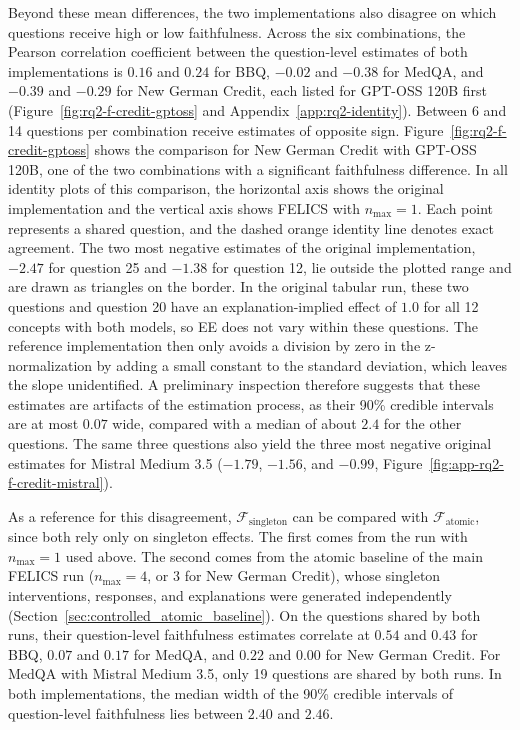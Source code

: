 Beyond these mean differences, the two implementations also disagree on which questions receive high or low faithfulness. Across the six combinations, the Pearson correlation coefficient between the question-level estimates of both implementations is $0.16$ and $0.24$ for BBQ, $-0.02$ and $-0.38$ for MedQA, and $-0.39$ and $-0.29$ for New German Credit, each listed for GPT-OSS 120B first (Figure~\ref{fig:rq2-f-credit-gptoss} and Appendix~\ref{app:rq2-identity}). Between 6 and 14 questions per combination receive estimates of opposite sign. Figure~\ref{fig:rq2-f-credit-gptoss} shows the comparison for New German Credit with GPT-OSS 120B, one of the two combinations with a significant faithfulness difference. In all identity plots of this comparison, the horizontal axis shows the original implementation and the vertical axis shows FELICS with $n_{\max}=1$. Each point represents a shared question, and the dashed orange identity line denotes exact agreement. The two most negative estimates of the original implementation, $-2.47$ for question 25 and $-1.38$ for question 12, lie outside the plotted range and are drawn as triangles on the border. In the original tabular run, these two questions and question 20 have an explanation-implied effect of $1.0$ for all 12 concepts with both models, so EE does not vary within these questions. The reference implementation then only avoids a division by zero in the z-normalization by adding a small constant to the standard deviation, which leaves the slope unidentified. A preliminary inspection therefore suggests that these estimates are artifacts of the estimation process, as their 90\% credible intervals are at most $0.07$ wide, compared with a median of about $2.4$ for the other questions. The same three questions also yield the three most negative original estimates for Mistral Medium 3.5 ($-1.79$, $-1.56$, and $-0.99$, Figure~\ref{fig:app-rq2-f-credit-mistral}).

As a reference for this disagreement, $\mathcal{F}_{\mathrm{singleton}}$ can be compared with $\mathcal{F}_{\mathrm{atomic}}$, since both rely only on singleton effects. The first comes from the run with $n_{\max}=1$ used above. The second comes from the atomic baseline of the main FELICS run ($n_{\max}=4$, or $3$ for New German Credit), whose singleton interventions, responses, and explanations were generated independently (Section~\ref{sec:controlled_atomic_baseline}). On the questions shared by both runs, their question-level faithfulness estimates correlate at $0.54$ and $0.43$ for BBQ, $0.07$ and $0.17$ for MedQA, and $0.22$ and $0.00$ for New German Credit. For MedQA with Mistral Medium 3.5, only 19 questions are shared by both runs. In both implementations, the median width of the 90\% credible intervals of question-level faithfulness lies between $2.40$ and $2.46$.

